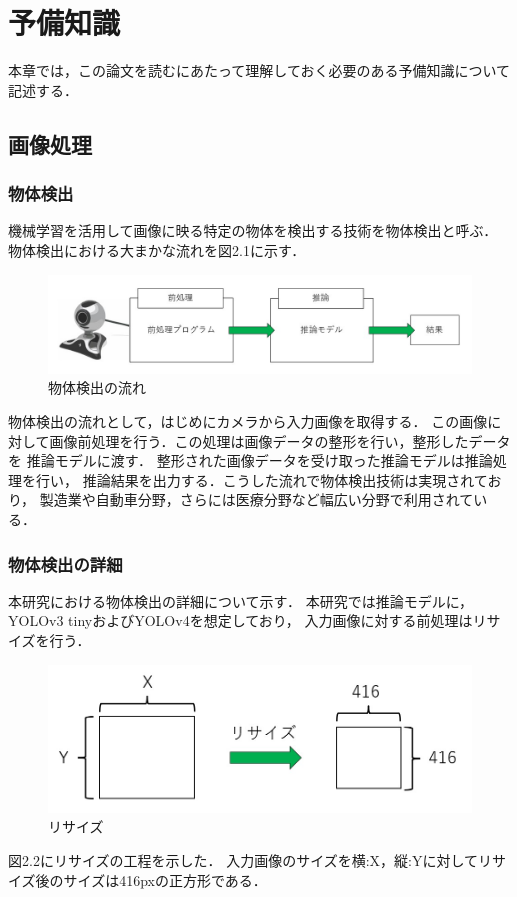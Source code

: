 \documentclass[11pt,a4j]{jreport}
\begin{document}
\chapter{予備知識}
本章では，この論文を読むにあたって理解しておく必要のある予備知識について記述する．
\section{画像処理}
\subsection{物体検出}
機械学習を活用して画像に映る特定の物体を検出する技術を物体検出と呼ぶ．
物体検出における大まかな流れを図2.1に示す．
\begin{figure}[H]
  \center
  \includegraphics[scale = 0.8]{pict/pict4.jpg}
  \caption{物体検出の流れ}
\end{figure}
物体検出の流れとして，はじめにカメラから入力画像を取得する．
この画像に対して画像前処理を行う．この処理は画像データの整形を行い，整形したデータを
推論モデルに渡す．
整形された画像データを受け取った推論モデルは推論処理を行い，
推論結果を出力する．こうした流れで物体検出技術は実現されており，
製造業や自動車分野，さらには医療分野など幅広い分野で利用されている．

\subsection{物体検出の詳細}
本研究における物体検出の詳細について示す．
本研究では推論モデルに，YOLOv3 tinyおよびYOLOv4を想定しており，
入力画像に対する前処理はリサイズを行う．
\begin{figure}[H]
  \center
  \includegraphics[scale = 0.8]{pict/pict5.jpg}
  \caption{リサイズ}
\end{figure}
図2.2にリサイズの工程を示した．
入力画像のサイズを横:X，縦:Yに対してリサイズ後のサイズは416pxの正方形である．
\end{document}
